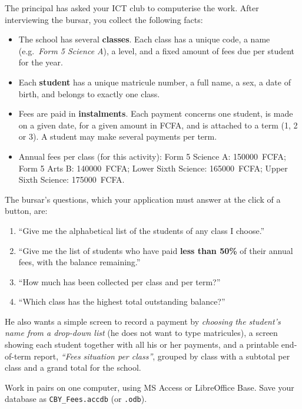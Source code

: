 \documentclass[11pt]{article}
\newcommand{\cle}[1]{{\popxbold\color{popdark}#1}}
\newcounter{popsec}
\newcounter{popsub}
\newcommand{\courssub}[1]{%
  \stepcounter{popsub}%
  \par\vspace{9pt}\noindent{\popxbold\fontsize{11.5}{13}\selectfont\color{popink}{\color{poporange}\thepopsec.\thepopsub}\hspace{6pt}#1}\par\nopagebreak\vspace{4pt}
}
\begin{document}
The principal has asked your ICT club to computerise the work. After interviewing the bursar, you collect the following facts:

\begin{itemize}
\item The school has several \textbf{classes}. Each class has a unique code, a name (e.g.\ \emph{Form 5 Science A}), a level, and a fixed amount of fees due per student for the year.
\item Each \textbf{student} has a unique matricule number, a full name, a sex, a date of birth, and belongs to exactly one class.
\item Fees are paid in \textbf{instalments}. Each payment concerns one student, is made on a given date, for a given amount in FCFA, and is attached to a term (1, 2 or 3). A student may make several payments per term.
\item Annual fees per class (for this activity): Form 5 Science A: \SI{150000}{FCFA}; Form 5 Arts B: \SI{140000}{FCFA}; Lower Sixth Science: \SI{165000}{FCFA}; Upper Sixth Science: \SI{175000}{FCFA}.
\end{itemize}

The bursar's questions, which your application must answer at the click of a button, are:

\begin{enumerate}
\item ``Give me the alphabetical list of the students of any class I choose.''
\item ``Give me the list of students who have paid \textbf{less than 50\%} of their annual fees, with the balance remaining.''
\item ``How much has been collected per class and per term?''
\item ``Which class has the highest total outstanding balance?''
\end{enumerate}

He also wants a simple screen to record a payment by \emph{choosing the student's name from a drop-down list} (he does not want to type matricules), a screen showing each student together with all his or her payments, and a printable end-of-term report, \emph{``Fees situation per class''}, grouped by class with a subtotal per class and a grand total for the school.

\courssub{Tasks}

Work in pairs on one computer, using \cle{MS Access} or \cle{LibreOffice Base}. Save your database as \texttt{CBY\_Fees.accdb} (or \texttt{.odb}).
\end{document}
